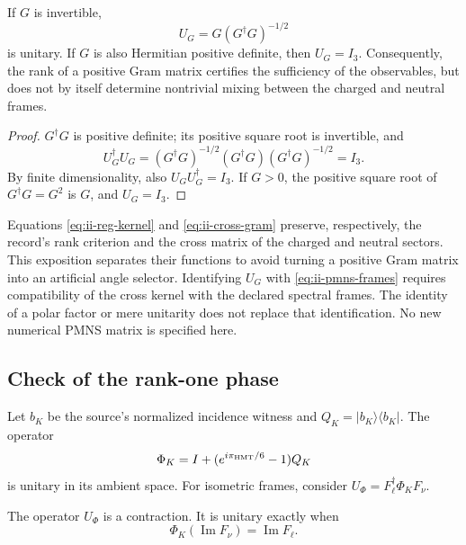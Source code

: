 \begin{proposition}
If \(G\) is invertible,
\begin{equation}
 U_G=G(G^\dagger G)^{-1/2}
 \label{eq:ii-polar}
\end{equation}
is unitary. If \(G\) is also Hermitian positive definite, then
\(U_G=I_3\). Consequently, the rank of a positive Gram matrix certifies
the sufficiency of the observables, but does not by itself determine
nontrivial mixing between the charged and neutral frames.
\end{proposition}

\begin{proof}
\(G^\dagger G\) is positive definite; its positive square root is invertible, and
\[
 U_G^\dagger U_G=(G^\dagger G)^{-1/2}(G^\dagger G)
 (G^\dagger G)^{-1/2}=I_3.
\]
By finite dimensionality, also
\(U_GU_G^\dagger=I_3\). If \(G>0\), the positive square root of
\(G^\dagger G=G^2\) is \(G\), and \(U_G=I_3\).
\end{proof}

\begin{remark}
Equations \eqref{eq:ii-reg-kernel} and \eqref{eq:ii-cross-gram}
preserve, respectively, the record's rank criterion and
the cross matrix of the charged and neutral sectors. This exposition
separates their functions to avoid turning a positive Gram matrix into an artificial
angle selector. Identifying \(U_G\) with
\eqref{eq:ii-pmns-frames} requires compatibility of the cross kernel
with the declared spectral frames. The identity of a polar factor
or mere unitarity does not replace that identification. No new
numerical PMNS matrix is specified here.
\end{remark}

\subsection{Check of the rank-one phase}

Let \(b_K\) be the source's normalized incidence witness and
\(Q_K=|b_K\rangle\langle b_K|\). The operator
\begin{equation}
 \Phi_K=I+(e^{i\pi_{\rm HMT}/6}-1)Q_K
 \label{eq:ii-rank-one-phase}
\end{equation}
is unitary in its ambient space. For isometric frames, consider
\(U_\Phi=F_\ell^\dagger\Phi_KF_\nu\).

\begin{proposition}
The operator \(U_\Phi\) is a contraction. It is unitary exactly
when
\begin{equation}
 \Phi_K(\operatorname{Im}F_\nu)=\operatorname{Im}F_\ell.
 \label{eq:ii-phase-compatibility}
\end{equation}
\end{proposition}

